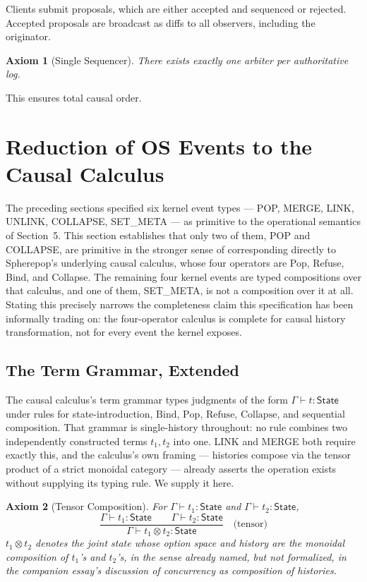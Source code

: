 \documentclass[11pt]{article}
\newtheorem{axiom}{Axiom}[section]
\begin{document}
Clients submit proposals, which are either accepted and sequenced or rejected. Accepted proposals are broadcast as diffs to all observers, including the originator.

\begin{axiom}[Single Sequencer]
\label{ax:single-sequencer}
There exists exactly one arbiter per authoritative log.
\end{axiom}

This ensures total causal order.

\section{Reduction of OS Events to the Causal Calculus}
\label{sec:reduction}

The preceding sections specified six kernel event types --- POP, MERGE, LINK, UNLINK, COLLAPSE, SET\_META --- as primitive to the operational semantics of Section~5. This section establishes that only two of them, POP and COLLAPSE, are primitive in the stronger sense of corresponding directly to Spherepop's underlying causal calculus, whose four operators are Pop, Refuse, Bind, and Collapse. The remaining four kernel events are typed compositions over that calculus, and one of them, SET\_META, is not a composition over it at all. Stating this precisely narrows the completeness claim this specification has been informally trading on: the four-operator calculus is complete for causal history transformation, not for every event the kernel exposes.

\subsection{The Term Grammar, Extended}

The causal calculus's term grammar types judgments of the form $\Gamma \vdash t : \mathsf{State}$ under rules for state-introduction, $\mathrm{Bind}$, $\mathrm{Pop}$, $\mathrm{Refuse}$, $\mathrm{Collapse}$, and sequential composition. That grammar is single-history throughout: no rule combines two independently constructed terms $t_1, t_2$ into one. LINK and MERGE both require exactly this, and the calculus's own framing --- histories compose via the tensor product of a strict monoidal category --- already asserts the operation exists without supplying its typing rule. We supply it here.

\begin{axiom}[Tensor Composition]
\label{ax:tensor}
For $\Gamma \vdash t_1 : \mathsf{State}$ and $\Gamma \vdash t_2 : \mathsf{State}$,
\[
\dfrac{\Gamma \vdash t_1 : \mathsf{State} \qquad \Gamma \vdash t_2 : \mathsf{State}}
{\Gamma \vdash t_1 \otimes t_2 : \mathsf{State}}
\quad \text{(tensor)}
\]
$t_1 \otimes t_2$ denotes the joint state whose option space and history are the monoidal composition of $t_1$'s and $t_2$'s, in the sense already named, but not formalized, in the companion essay's discussion of concurrency as composition of histories.
\end{axiom}
\end{document}
